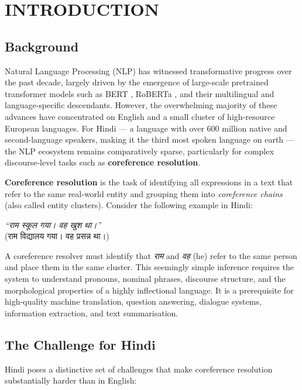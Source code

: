 \documentclass[12pt,a4paper]{report}
\begin{document}
\chapter{INTRODUCTION}

\section{Background}

Natural Language Processing (NLP) has witnessed transformative progress over the past decade, largely driven by the emergence of large-scale pretrained transformer models such as BERT \cite{devlin2018bert}, RoBERTa \cite{liu2019roberta}, and their multilingual and language-specific descendants. However, the overwhelming majority of these advances have concentrated on English and a small cluster of high-resource European languages. For Hindi --- a language with over 600 million native and second-language speakers, making it the third most spoken language on earth --- the NLP ecosystem remains comparatively sparse, particularly for complex discourse-level tasks such as \textbf{coreference resolution}.

\textbf{Coreference resolution} is the task of identifying all expressions in a text that refer to the same real-world entity and grouping them into \textit{coreference chains} (also called entity clusters). Consider the following example in Hindi:

\begin{center}
\textit{``{\hindifont राम स्कूल गया। वह खुश था।}''}\\
({\hindifont राम विद्यालय गया। वह प्रसन्न था।})
\end{center}

A coreference resolver must identify that \textit{{\hindifont राम}} and \textit{{\hindifont वह}} (he) refer to the same person and place them in the same cluster. This seemingly simple inference requires the system to understand pronouns, nominal phrases, discourse structure, and the morphological properties of a highly inflectional language. It is a prerequisite for high-quality machine translation, question answering, dialogue systems, information extraction, and text summarisation.

\section{The Challenge for Hindi}

Hindi poses a distinctive set of challenges that make coreference resolution substantially harder than in English:
\end{document}
